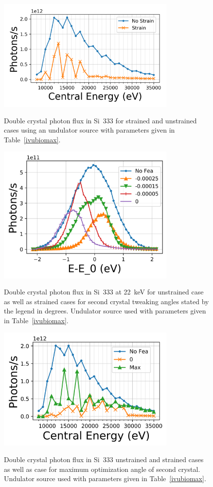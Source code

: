 \documentclass[preprint]{iucr}              %
\begin{document}
\begin{figure}
\caption{Double crystal photon flux in Si~333 for strained and unstrained cases using an undulator source with parameters given in Table~\ref{ivubiomax}.}
\includegraphics[width = 8.85cm]{images/ivu333flux.png}
\label{fig:ivu333flux}
\end{figure}

\begin{figure}
\caption{Double crystal photon flux in Si~333 at 22~keV for unstrained case as well as strained cases for second crystal tweaking angles stated by the legend in degrees. Undulator source used with parameters given in Table~\ref{ivubiomax}.}
\includegraphics[width = 8.85cm]{images/22kevangle.png}
\label{fig:22kevangle}
\end{figure}

\begin{figure}
\caption{Double crystal photon flux in Si~333 unstrained and strained cases as well as case for maximum optimization angle of second crystal. Undulator source used with parameters given in Table~\ref{ivubiomax}.}
\includegraphics[width = 8.85cm]{images/maxangleflux.png}
\label{fig:maxangleflux}
\end{figure}
\end{document}
